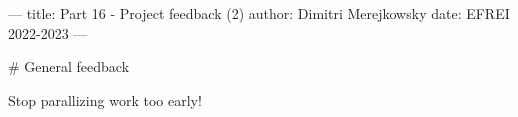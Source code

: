 ---
title: Part 16 - Project feedback (2)
author: Dimitri Merejkowsky
date: EFREI 2022-2023
---

# General feedback

Stop parallizing work too early!
